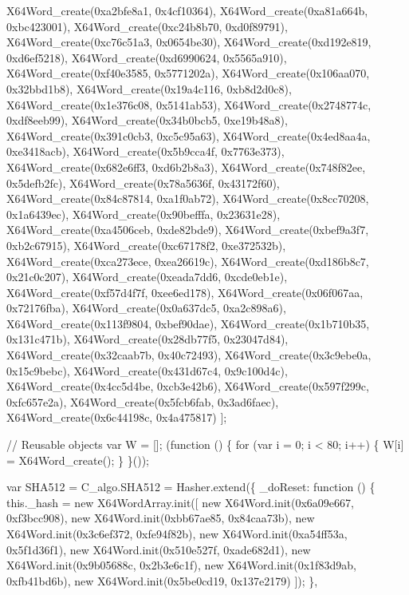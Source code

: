 \begin{DoxyCodeInclude}
        X64Word\_create(0xa2bfe8a1, 0x4cf10364), X64Word\_create(0xa81a664b, 0xbc423001),
        X64Word\_create(0xc24b8b70, 0xd0f89791), X64Word\_create(0xc76c51a3, 0x0654be30),
        X64Word\_create(0xd192e819, 0xd6ef5218), X64Word\_create(0xd6990624, 0x5565a910),
        X64Word\_create(0xf40e3585, 0x5771202a), X64Word\_create(0x106aa070, 0x32bbd1b8),
        X64Word\_create(0x19a4c116, 0xb8d2d0c8), X64Word\_create(0x1e376c08, 0x5141ab53),
        X64Word\_create(0x2748774c, 0xdf8eeb99), X64Word\_create(0x34b0bcb5, 0xe19b48a8),
        X64Word\_create(0x391c0cb3, 0xc5c95a63), X64Word\_create(0x4ed8aa4a, 0xe3418acb),
        X64Word\_create(0x5b9cca4f, 0x7763e373), X64Word\_create(0x682e6ff3, 0xd6b2b8a3),
        X64Word\_create(0x748f82ee, 0x5defb2fc), X64Word\_create(0x78a5636f, 0x43172f60),
        X64Word\_create(0x84c87814, 0xa1f0ab72), X64Word\_create(0x8cc70208, 0x1a6439ec),
        X64Word\_create(0x90befffa, 0x23631e28), X64Word\_create(0xa4506ceb, 0xde82bde9),
        X64Word\_create(0xbef9a3f7, 0xb2c67915), X64Word\_create(0xc67178f2, 0xe372532b),
        X64Word\_create(0xca273ece, 0xea26619c), X64Word\_create(0xd186b8c7, 0x21c0c207),
        X64Word\_create(0xeada7dd6, 0xcde0eb1e), X64Word\_create(0xf57d4f7f, 0xee6ed178),
        X64Word\_create(0x06f067aa, 0x72176fba), X64Word\_create(0x0a637dc5, 0xa2c898a6),
        X64Word\_create(0x113f9804, 0xbef90dae), X64Word\_create(0x1b710b35, 0x131c471b),
        X64Word\_create(0x28db77f5, 0x23047d84), X64Word\_create(0x32caab7b, 0x40c72493),
        X64Word\_create(0x3c9ebe0a, 0x15c9bebc), X64Word\_create(0x431d67c4, 0x9c100d4c),
        X64Word\_create(0x4cc5d4be, 0xcb3e42b6), X64Word\_create(0x597f299c, 0xfc657e2a),
        X64Word\_create(0x5fcb6fab, 0x3ad6faec), X64Word\_create(0x6c44198c, 0x4a475817)
    ];

    \textcolor{comment}{// Reusable objects}
    var W = [];
    (\textcolor{keyword}{function} () \{
        \textcolor{keywordflow}{for} (var i = 0; i < 80; i++) \{
            W[i] = X64Word\_create();
        \}
    \}());

    var SHA512 = C\_algo.SHA512 = Hasher.extend(\{
        \_doReset: \textcolor{keyword}{function} () \{
            this.\_hash = \textcolor{keyword}{new} X64WordArray.init([
                \textcolor{keyword}{new} X64Word.init(0x6a09e667, 0xf3bcc908), \textcolor{keyword}{new} X64Word.init(0xbb67ae85, 0x84caa73b),
                \textcolor{keyword}{new} X64Word.init(0x3c6ef372, 0xfe94f82b), \textcolor{keyword}{new} X64Word.init(0xa54ff53a, 0x5f1d36f1),
                \textcolor{keyword}{new} X64Word.init(0x510e527f, 0xade682d1), \textcolor{keyword}{new} X64Word.init(0x9b05688c, 0x2b3e6c1f),
                \textcolor{keyword}{new} X64Word.init(0x1f83d9ab, 0xfb41bd6b), \textcolor{keyword}{new} X64Word.init(0x5be0cd19, 0x137e2179)
            ]);
        \},


\end{DoxyCodeInclude}
